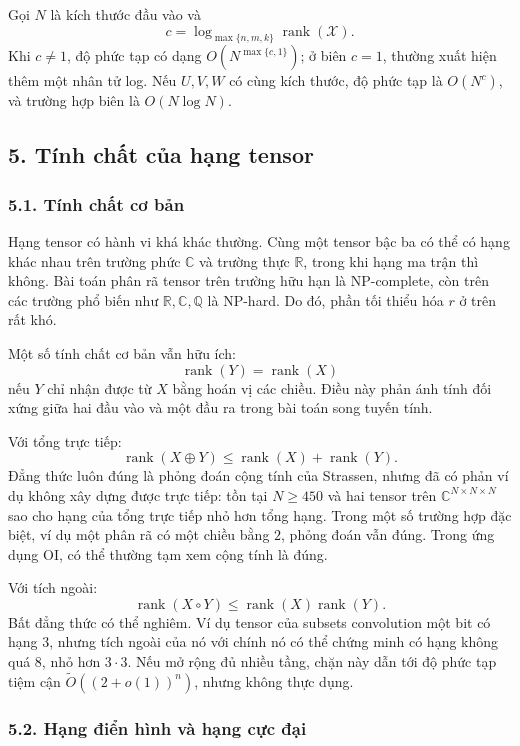 \documentclass[11pt]{article}
\begin{document}
Gọi \(N\) là kích thước đầu vào và
\[
  c=\log_{\max\{n,m,k\}}\operatorname{rank}(\mathcal X).
\]
Khi \(c\ne 1\), độ phức tạp có dạng \(O(N^{\max\{c,1\}})\); ở biên \(c=1\),
thường xuất hiện thêm một nhân tử log. Nếu \(U,V,W\) có cùng kích thước, độ
phức tạp là \(O(N^c)\), và trường hợp biên là \(O(N\log N)\).

\subsection*{5. Tính chất của hạng tensor}

\subsubsection*{5.1. Tính chất cơ bản}

Hạng tensor có hành vi khá khác thường. Cùng một tensor bậc ba có thể có hạng
khác nhau trên trường phức \(\mathbb C\) và trường thực \(\mathbb R\), trong
khi hạng ma trận thì không. Bài toán phân rã tensor trên trường hữu hạn là
NP-complete, còn trên các trường phổ biến như \(\mathbb R,\mathbb C,\mathbb Q\)
là NP-hard. Do đó, phần tối thiểu hóa \(r\) ở trên rất khó.

Một số tính chất cơ bản vẫn hữu ích:
\[
  \operatorname{rank}(Y)=\operatorname{rank}(X)
\]
nếu \(Y\) chỉ nhận được từ \(X\) bằng hoán vị các chiều. Điều này phản ánh
tính đối xứng giữa hai đầu vào và một đầu ra trong bài toán song tuyến tính.

Với tổng trực tiếp:
\[
  \operatorname{rank}(X\oplus Y)\le \operatorname{rank}(X)+\operatorname{rank}(Y).
\]
Đẳng thức luôn đúng là phỏng đoán cộng tính của Strassen, nhưng đã có phản ví
dụ không xây dựng được trực tiếp: tồn tại \(N\ge 450\) và hai tensor trên
\(\mathbb C^{N\times N\times N}\) sao cho hạng của tổng trực tiếp nhỏ hơn tổng
hạng. Trong một số trường hợp đặc biệt, ví dụ một phân rã có một chiều bằng
\(2\), phỏng đoán vẫn đúng. Trong ứng dụng OI, có thể thường tạm xem cộng tính
là đúng.

Với tích ngoài:
\[
  \operatorname{rank}(X\circ Y)\le
  \operatorname{rank}(X)\operatorname{rank}(Y).
\]
Bất đẳng thức có thể nghiêm. Ví dụ tensor của subsets convolution một bit có
hạng \(3\), nhưng tích ngoài của nó với chính nó có thể chứng minh có hạng
không quá \(8\), nhỏ hơn \(3\cdot 3\). Nếu mở rộng đủ nhiều tầng, chặn này dẫn
tới độ phức tạp tiệm cận \(\widetilde O((2+o(1))^n)\), nhưng không thực dụng.

\subsubsection*{5.2. Hạng điển hình và hạng cực đại}
\end{document}
